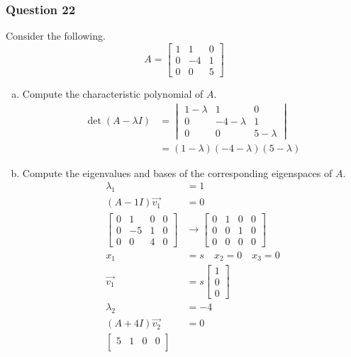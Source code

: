 \documentclass{math}
\begin{document}
\subsubsection*{Question 22}
Consider the following.
\[ A = \begin{bmatrix}
  1 & 1 & 0 \\
  0 & -4 & 1 \\
  0 & 0 & 5
\end{bmatrix} \]
\begin{enumerate}[(a)]
  \item Compute the characteristic polynomial of \( A \).
  \begin{align*}
    \det(A-\lambda I) &= \begin{vmatrix}
      1-\lambda & 1 & 0 \\
      0 & -4-\lambda & 1 \\
      0 & 0 & 5-\lambda
    \end{vmatrix} \\
    &= (1-\lambda)(-4-\lambda)(5-\lambda)
  \end{align*}
  \item Compute the eigenvalues and bases of the corresponding eigenspaces of
    \( A \).
  \begin{align*}
    \lambda_1 &= 1 \\
    (A-1I)\vec{v_1} &= 0 \\
    \begin{bmatrix}
      0 & 1 & 0 & 0 \\
      0 & -5 & 1 & 0 \\
      0 & 0 & 4 & 0
    \end{bmatrix} &\to \begin{bmatrix}
      0 & 1 & 0 & 0 \\
      0 & 0 & 1 & 0 \\
      0 & 0 & 0 & 0
    \end{bmatrix} \\
    x_1 &= s \quad x_2 = 0 \quad x_3 = 0 \\
    \vec{v_1} &= s\begin{bmatrix}1 \\ 0 \\ 0\end{bmatrix} \\
    \lambda_2 &= -4 \\
    (A+4I)\vec{v_2} &= 0 \\
    \begin{bmatrix}
      5 & 1 & 0 & 0 \\

\end{bmatrix}
\end{align*}
\end{enumerate}
\end{document}
